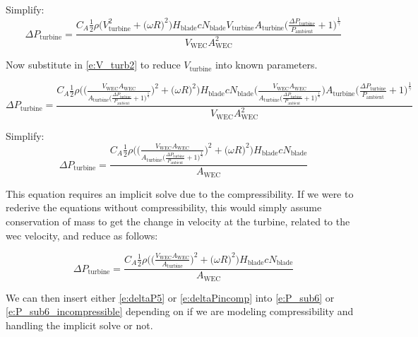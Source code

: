 \documentclass[conf]{new-aiaa}
\begin{document}
Simplify:
    \begin{equation}
\label{e:deltaP3}
\Delta P_\text{turbine} = \frac{C_A \frac{1}{2}\rho \Bigg(V_\text{turbine}^2 + \bigg(\omega R \bigg)^2 \Bigg) H_\text{blade} c N_\text{blade} V_\text{turbine} A_\text{turbine} \bigg(\frac{\Delta P_\text{turbine}} {P_\text{ambient}} + 1 \bigg)^\frac{1}{\gamma}} {V_\text{WEC} A_\text{WEC}^2}
\end{equation}


Now substitute in \cref{e:V_turb2} to reduce $V_\text{turbine}$ into known parameters.

    \begin{equation}
\label{e:deltaP4}
\Delta P_\text{turbine} = \frac{C_A \frac{1}{2}\rho \Bigg(\Bigg(\frac{V_\text{WEC} A_\text{WEC}} {A_\text{turbine} \bigg(\frac{\Delta P_\text{turbine} }{P_\text{ambient} } + 1\bigg)^\frac{1}{\gamma}}\Bigg)^2 + \bigg(\omega R \bigg)^2 \Bigg) H_\text{blade} c N_\text{blade} \Bigg(\frac{V_\text{WEC} A_\text{WEC}} {A_\text{turbine} \bigg(\frac{\Delta P_\text{turbine} }{P_\text{ambient} } + 1\bigg)^\frac{1}{\gamma}}\Bigg) A_\text{turbine} \bigg(\frac{\Delta P_\text{turbine}} {P_\text{ambient}} + 1 \bigg)^\frac{1}{\gamma}} {V_\text{WEC} A_\text{WEC}^2}
\end{equation}

Simplify:
    \begin{equation}
\label{e:deltaP5}
\Delta P_\text{turbine} = \frac{C_A \frac{1}{2}\rho \Bigg(\Bigg(\frac{V_\text{WEC} A_\text{WEC}} {A_\text{turbine} \bigg(\frac{\Delta P_\text{turbine} }{P_\text{ambient} } + 1\bigg)^\frac{1}{\gamma}}\Bigg)^2 + \bigg(\omega R \bigg)^2 \Bigg) H_\text{blade} c N_\text{blade} } {A_\text{WEC}}
\end{equation}

This equation requires an implicit solve due to the compressibility.  If we were to rederive the equations without compressibility, this would simply assume conservation of mass to get the change in velocity at the turbine, related to the wec velocity, and reduce as follows:

    \begin{equation}
\label{e:deltaPincomp}
\Delta P_\text{turbine} = \frac{C_A \frac{1}{2}\rho \Bigg(\Bigg(\frac{V_\text{WEC} A_\text{WEC}} {A_\text{turbine} }\Bigg)^2 + \bigg(\omega R \bigg)^2 \Bigg) H_\text{blade} c N_\text{blade} } {A_\text{WEC}}
\end{equation}

We can then insert either \cref{e:deltaP5} or \cref{e:deltaPincomp} into \cref{e:P_sub6} or \cref{e:P_sub6_incompressible} depending on if we are modeling compressibility and handling the implicit solve or not. \\
\end{document}
